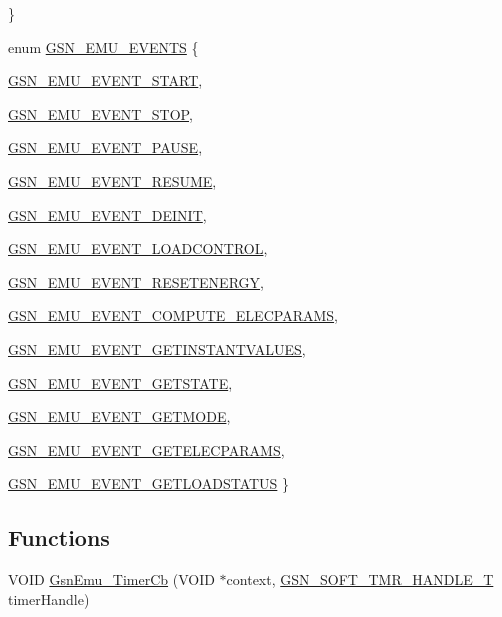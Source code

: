 \begin{DoxyCompactItemize}
 \}
\item 
enum \hyperlink{a00490_a160be712e5fe9a0be8527f6c7f5af417}{GSN\_\-EMU\_\-EVENTS} \{ \par
\hyperlink{a00490_a160be712e5fe9a0be8527f6c7f5af417abfac711a4f311ca6490c2b749f73a389}{GSN\_\-EMU\_\-EVENT\_\-START}, 
\par
\hyperlink{a00490_a160be712e5fe9a0be8527f6c7f5af417a89ec0168d2d060ce97feaf94e36c92f3}{GSN\_\-EMU\_\-EVENT\_\-STOP}, 
\par
\hyperlink{a00490_a160be712e5fe9a0be8527f6c7f5af417a3da6f5fb7eec184440e1e520bf5f6c2b}{GSN\_\-EMU\_\-EVENT\_\-PAUSE}, 
\par
\hyperlink{a00490_a160be712e5fe9a0be8527f6c7f5af417acc94f88e33ff719ea9019a1ad2bb5a61}{GSN\_\-EMU\_\-EVENT\_\-RESUME}, 
\par
\hyperlink{a00490_a160be712e5fe9a0be8527f6c7f5af417aecc4e890da43d92f85b400b9829715eb}{GSN\_\-EMU\_\-EVENT\_\-DEINIT}, 
\par
\hyperlink{a00490_a160be712e5fe9a0be8527f6c7f5af417a6fbaef58bddfcceed061a90a60ce34ed}{GSN\_\-EMU\_\-EVENT\_\-LOADCONTROL}, 
\par
\hyperlink{a00490_a160be712e5fe9a0be8527f6c7f5af417a69a88ddeda32d765f9cafbff57d1e2fe}{GSN\_\-EMU\_\-EVENT\_\-RESETENERGY}, 
\par
\hyperlink{a00490_a160be712e5fe9a0be8527f6c7f5af417ab0b434b065eaf70a2996a5591641a98f}{GSN\_\-EMU\_\-EVENT\_\-COMPUTE\_\-ELECPARAMS}, 
\par
\hyperlink{a00490_a160be712e5fe9a0be8527f6c7f5af417a80867e67289aff37da1e4a92e81595bc}{GSN\_\-EMU\_\-EVENT\_\-GETINSTANTVALUES}, 
\par
\hyperlink{a00490_a160be712e5fe9a0be8527f6c7f5af417a01639c59a88dbaca343e49e582d029a0}{GSN\_\-EMU\_\-EVENT\_\-GETSTATE}, 
\par
\hyperlink{a00490_a160be712e5fe9a0be8527f6c7f5af417a6b559cb28adc2517c0946c0ba65d058d}{GSN\_\-EMU\_\-EVENT\_\-GETMODE}, 
\par
\hyperlink{a00490_a160be712e5fe9a0be8527f6c7f5af417a46399b705d731f3aa7c09bf1ca5cdfc8}{GSN\_\-EMU\_\-EVENT\_\-GETELECPARAMS}, 
\par
\hyperlink{a00490_a160be712e5fe9a0be8527f6c7f5af417a4b9946a9c4e7fc9dd3d58fa95e5e30e8}{GSN\_\-EMU\_\-EVENT\_\-GETLOADSTATUS}
 \}
\end{DoxyCompactItemize}
\subsection*{Functions}
\begin{DoxyCompactItemize}
\item 
VOID \hyperlink{a00490_a006c1a4b19d87c0eb0ad8d90ba94501b}{GsnEmu\_\-TimerCb} (VOID $\ast$context, \hyperlink{a00229}{GSN\_\-SOFT\_\-TMR\_\-HANDLE\_\-T} timerHandle)
\end{DoxyCompactItemize}


